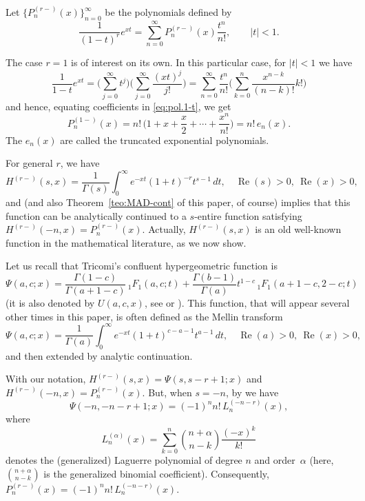 \documentclass[11pt,a4paper]{amsart}
\renewcommand{\Re}{\operatorname{Re}}
\theoremstyle{plain}
\theoremstyle{plain}
\theoremstyle{remark}
\numberwithin{equation}{section}
\begin{document}
Let $\{P_n^{(r-)}(x)\}_{n=0}^{\infty}$ be the polynomials defined by
\begin{equation}
\label{eq:pol.1-t}
  \frac{1}{(1-t)^r} e^{xt} = \sum_{n=0}^{\infty} P_n^{(r-)}(x) \frac{t^n}{n!},
  \qquad |t| < 1.
\end{equation}

The case $r=1$ is of interest on its own. In this particular case, for $|t|<1$ we have
\[
  \frac{1}{1-t} e^{xt} 
  = \Biggl(\sum_{j=0}^{\infty} t^j \Biggr) \Biggl(\sum_{j=0}^{\infty} \frac{(xt)^j}{j!} \Biggr) 
  = \sum_{n=0}^{\infty} \frac{t^n}{n!} \Biggl(\sum_{k=0}^{n} \frac{x^{n-k}}{(n-k)!}k! \Biggr)
\]
and hence, equating coefficients in \eqref{eq:pol.1-t}, we get
\begin{equation}
\label{eq:pol.en}
  P_n^{(1-)}(x) = n!\,\Big(1+x+\frac{x}{2}+ \cdots +\frac{x^n}{n!}\Big) = n!\,e_n(x). 
\end{equation}
The $e_n(x)$ are called the truncated exponential polynomials.

For general $r$, we have
\begin{equation*}
  H^{(r-)}(s,x) = \frac{1}{\Gamma(s)} \int_{0}^{\infty} e^{-xt}(1+t)^{-r} t^{s-1} \,dt,
  \quad \Re(s)>0,\ \Re(x)>0,
\end{equation*}
and \cite[Theorem~1]{NRV} (and also Theorem~\ref{teo:MAD-cont} of this paper, of course) implies that this function can be analytically continued to a $s$-entire function satisfying $H^{(r-)}(-n,x) = P_n^{(r-)}(x)$. Actually, $H^{(r-)}(s,x)$ is an old well-known function in the mathematical literature, as we now show.

Let us recall that Tricomi's confluent hypergeometric function is 
\[
  \Psi(a,c;x) =
  \frac{\Gamma(1-c)}{\Gamma(a+1-c)} \,{}_1 F_1(a, c; t)
  + \frac{\Gamma(b-1)}{\Gamma(a)} t^{1-c} \,{}_1F_1(a+1-c, 2-c; t)
\]
(it is also denoted by $U(a,c,x)$, see \cite[\S\,6.5, equation~(2)]{EMOT-HTF-v1} or \cite[p.~242 in \S\,5.5.2]{MOT}).
This function, that will appear several other times in this paper, is often defined as the Mellin transform
\begin{equation*}
  \Psi(a,c;x) = \frac{1}{\Gamma(a)} \int_0^{\infty}e^{-xt}(1+t)^{c-a-1} t^{a-1}\,dt, 
  \quad \Re(a)>0,\ \Re(x)>0,
\end{equation*}
and then extended by analytic continuation.

With our notation, $H^{(r-)}(s,x) = \Psi(s,s-r+1;x)$ and $H^{(r-)}(-n,x) = P_n^{(r-)}(x)$.
But, when $s=-n$, by \cite[\S\,6.9.2, equation~(36)]{EMOT-HTF-v1} we have
\begin{equation*}
  \Psi(-n,-n-r+1;x) = (-1)^n n!\,L_{n}^{(-n-r)}(x),
\end{equation*}
where
\[
  L_{n}^{(\alpha)}(x) = \sum_{k=0}^{n} \binom{n+\alpha}{n-k} \frac{(-x)^k}{k!}
\]
denotes the (generalized) Laguerre polynomial of degree $n$ and order~$\alpha$ (here, $\binom{n+\alpha}{n-k}$ is the generalized binomial coefficient). Consequently, $P_n^{(r-)}(x) = (-1)^n n!\,L_{n}^{(-n-r)}(x)$.
\end{document}
